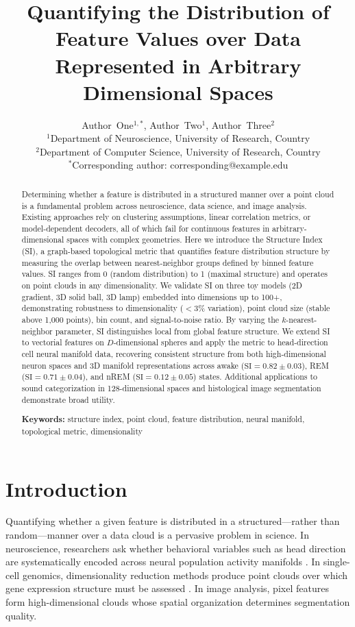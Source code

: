 \documentclass[11pt]{article}
\title{Quantifying the Distribution of Feature Values over Data Represented in Arbitrary Dimensional Spaces}
\author{
Author~One$^{1,*}$, Author~Two$^{1}$, Author~Three$^{2}$ \\[6pt]
$^{1}$Department of Neuroscience, University of Research, Country \\
$^{2}$Department of Computer Science, University of Research, Country \\[4pt]
$^{*}$Corresponding author: corresponding@example.edu
}
\date{}
\begin{document}
\maketitle

\begin{abstract}
Determining whether a feature is distributed in a structured manner over a point cloud is a fundamental problem across neuroscience, data science, and image analysis. Existing approaches rely on clustering assumptions, linear correlation metrics, or model-dependent decoders, all of which fail for continuous features in arbitrary-dimensional spaces with complex geometries. Here we introduce the Structure Index (SI), a graph-based topological metric that quantifies feature distribution structure by measuring the overlap between nearest-neighbor groups defined by binned feature values. SI ranges from 0 (random distribution) to 1 (maximal structure) and operates on point clouds in any dimensionality. We validate SI on three toy models (2D gradient, 3D solid ball, 3D lamp) embedded into dimensions up to 100+, demonstrating robustness to dimensionality ($<3\%$ variation), point cloud size (stable above 1{,}000 points), bin count, and signal-to-noise ratio. By varying the $k$-nearest-neighbor parameter, SI distinguishes local from global feature structure. We extend SI to vectorial features on $D$-dimensional spheres and apply the metric to head-direction cell neural manifold data, recovering consistent structure from both high-dimensional neuron spaces and 3D manifold representations across awake ($\text{SI} = 0.82 \pm 0.03$), REM ($\text{SI} = 0.71 \pm 0.04$), and nREM ($\text{SI} = 0.12 \pm 0.05$) states. Additional applications to sound categorization in 128-dimensional spaces and histological image segmentation demonstrate broad utility.

\vspace{0.5em}
\noindent\textbf{Keywords:} structure index, point cloud, feature distribution, neural manifold, topological metric, dimensionality
\end{abstract}

\section{Introduction}

Quantifying whether a given feature is distributed in a structured---rather than random---manner over a data cloud is a pervasive problem in science. In neuroscience, researchers ask whether behavioral variables such as head direction are systematically encoded across neural population activity manifolds \citep{peyrache2015internally, chaudhuri2019intrinsic, gardner2022toroidal}. In single-cell genomics, dimensionality reduction methods produce point clouds over which gene expression structure must be assessed \citep{becht2019dimensionality, kobak2019art}. In image analysis, pixel features form high-dimensional clouds whose spatial organization determines segmentation quality.
\end{document}
